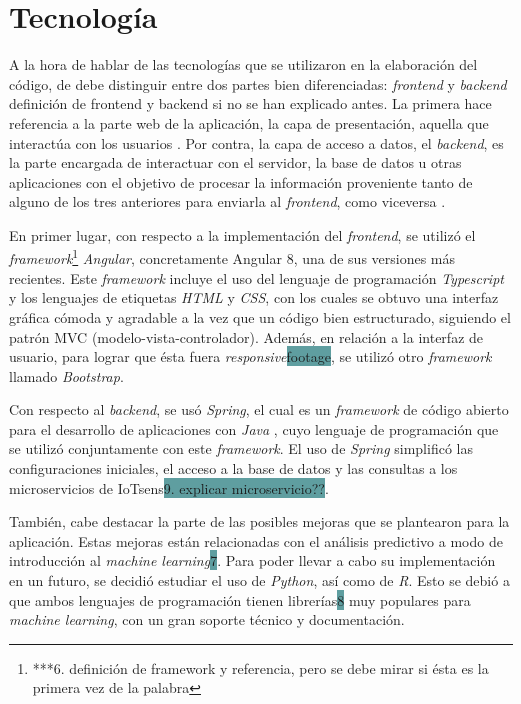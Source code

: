 \documentclass[pdftex,11pt,a4paper]{book}
\begin{document}
\section{Tecnología}

A la hora de hablar de las tecnologías que se utilizaron en la elaboración del código, de debe distinguir entre dos partes bien diferenciadas: \textit{frontend} y \textit{backend} \colorbox{MiColor}{definición de frontend y backend si no se han explicado antes}. La primera hace referencia a la parte web de la aplicación, la capa de presentación, aquella que interactúa con los usuarios \cite{bib:front-end}. Por contra, la capa de acceso a datos, el \textit{backend}, es la parte encargada de interactuar con el servidor, la base de datos u otras aplicaciones con el objetivo de procesar la información proveniente tanto de alguno de los tres anteriores para enviarla al \textit{frontend}, como viceversa \cite{bib:frontendybackend}.

En primer lugar, con respecto a la implementación del \textit{frontend}, se utilizó el \textit{framework}\footnote{\colorbox{MiColor}{ ***6. definición de framework y referencia, pero se debe mirar si ésta es la primera vez de la palabra} } \textit{Angular}, concretamente Angular 8, una de sus versiones más recientes. Este \textit{framework} incluye el uso del lenguaje de programación \textit{Typescript} y los lenguajes de etiquetas \textit{HTML} y \textit{CSS}, con los cuales se obtuvo una interfaz gráfica cómoda y agradable a la vez que un código bien estructurado, siguiendo el patrón MVC (modelo-vista-controlador). Además, en relación a la interfaz de usuario, para lograr que ésta fuera \textit{responsive}\colorbox{CadetBlue}{footage}, se utilizó otro \textit{framework} llamado \textit{Bootstrap}.

Con respecto al \textit{backend}, se usó \textit{Spring}, el cual es un \textit{framework} de código abierto para el desarrollo de aplicaciones con \textit{Java} \cite{bib:spring}, cuyo lenguaje de programación que se utilizó conjuntamente con este \textit{framework}. El uso de \textit{Spring} simplificó las configuraciones iniciales, el acceso a la base de datos y las consultas a los microservicios de IoTsens\colorbox{CadetBlue}{9. explicar microservicio??}.  

También, cabe destacar la parte de las posibles mejoras que se plantearon para la aplicación. Estas mejoras están relacionadas con el análisis predictivo a modo de introducción al \textit{machine learning}\colorbox{CadetBlue}{7}. Para poder llevar a cabo su implementación en un futuro, se decidió estudiar el uso de \textit{Python}, así como de \textit{R}. Esto se debió a que ambos lenguajes de programación tienen librerías\colorbox{CadetBlue}{8} muy populares para \textit{machine learning}, con un gran soporte técnico y documentación.
\end{document}
